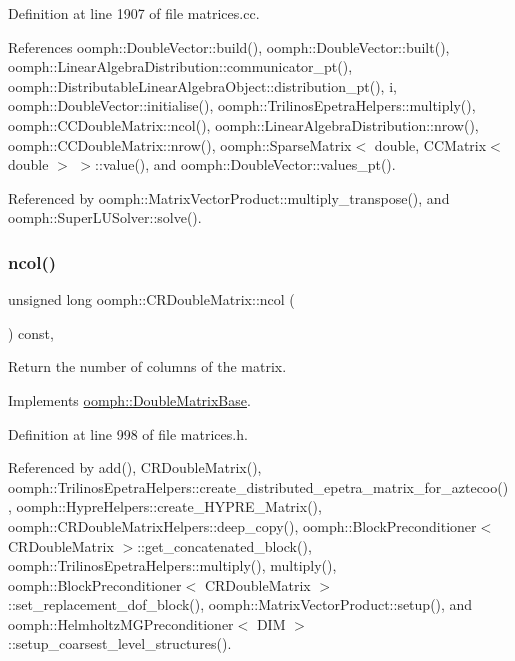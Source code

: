 Definition at line 1907 of file matrices.\+cc.



References oomph\+::\+Double\+Vector\+::build(), oomph\+::\+Double\+Vector\+::built(), oomph\+::\+Linear\+Algebra\+Distribution\+::communicator\+\_\+pt(), oomph\+::\+Distributable\+Linear\+Algebra\+Object\+::distribution\+\_\+pt(), i, oomph\+::\+Double\+Vector\+::initialise(), oomph\+::\+Trilinos\+Epetra\+Helpers\+::multiply(), oomph\+::\+C\+C\+Double\+Matrix\+::ncol(), oomph\+::\+Linear\+Algebra\+Distribution\+::nrow(), oomph\+::\+C\+C\+Double\+Matrix\+::nrow(), oomph\+::\+Sparse\+Matrix$<$ double, C\+C\+Matrix$<$ double $>$ $>$\+::value(), and oomph\+::\+Double\+Vector\+::values\+\_\+pt().



Referenced by oomph\+::\+Matrix\+Vector\+Product\+::multiply\+\_\+transpose(), and oomph\+::\+Super\+L\+U\+Solver\+::solve().

\mbox{\label{classoomph_1_1CRDoubleMatrix_a4ed5597d8a34dd14f90b0e6cfb88ca2e}} 
\subsubsection{\texorpdfstring{ncol()}{ncol()}}
{\footnotesize\ttfamily unsigned long oomph\+::\+C\+R\+Double\+Matrix\+::ncol (\begin{DoxyParamCaption}{ }\end{DoxyParamCaption}) const\hspace{0.3cm}{\ttfamily [inline]}, {\ttfamily [virtual]}}



Return the number of columns of the matrix. 



Implements \hyperlink{classoomph_1_1DoubleMatrixBase_a253feffbf1db1976cdd86c6134c50abe}{oomph\+::\+Double\+Matrix\+Base}.



Definition at line 998 of file matrices.\+h.



Referenced by add(), C\+R\+Double\+Matrix(), oomph\+::\+Trilinos\+Epetra\+Helpers\+::create\+\_\+distributed\+\_\+epetra\+\_\+matrix\+\_\+for\+\_\+aztecoo(), oomph\+::\+Hypre\+Helpers\+::create\+\_\+\+H\+Y\+P\+R\+E\+\_\+\+Matrix(), oomph\+::\+C\+R\+Double\+Matrix\+Helpers\+::deep\+\_\+copy(), oomph\+::\+Block\+Preconditioner$<$ C\+R\+Double\+Matrix $>$\+::get\+\_\+concatenated\+\_\+block(), oomph\+::\+Trilinos\+Epetra\+Helpers\+::multiply(), multiply(), oomph\+::\+Block\+Preconditioner$<$ C\+R\+Double\+Matrix $>$\+::set\+\_\+replacement\+\_\+dof\+\_\+block(), oomph\+::\+Matrix\+Vector\+Product\+::setup(), and oomph\+::\+Helmholtz\+M\+G\+Preconditioner$<$ D\+I\+M $>$\+::setup\+\_\+coarsest\+\_\+level\+\_\+structures().

